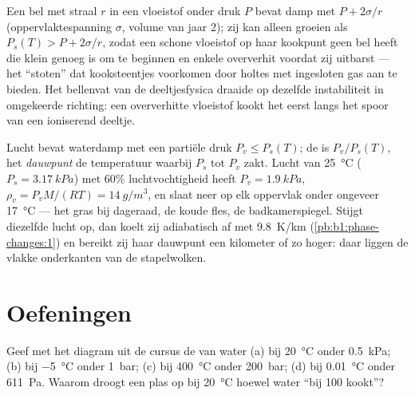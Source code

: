 \begin{remark}\label{rem:b1:phase-changes:nucleation}
Een bel met straal $r$ in een vloeistof onder druk $P$ bevat damp met
$P + 2\sigma/r$ (oppervlaktespanning $\sigma$, volume van jaar 2); zij kan alleen
groeien als $P_s(T) > P + 2\sigma/r$, zodat een schone vloeistof op haar kookpunt
geen bel heeft die klein genoeg is om te beginnen en enkele  oververhit
voordat zij uitbarst --- het ``stoten'' dat kooksteentjes voorkomen door
holtes met ingesloten gas aan te bieden. Het bellenvat van de deeltjesfysica
draaide op dezelfde instabiliteit in omgekeerde richting: een oververhitte vloeistof
kookt het eerst langs het spoor van een ioniserend deeltje.
\end{remark}

\begin{example}\label{ex:b1:phase-changes:dew}
Lucht bevat waterdamp met een partiële druk $P_v \leq P_s(T)$; de
\emph{} is $P_v/P_s(T)$, het \emph{dauwpunt} de
temperatuur waarbij $P_s$ tot $P_v$ zakt. Lucht van \qty{25}{\degreeCelsius}
($P_s = \qty{3.17}{kPa}$) met $60\%$ luchtvochtigheid heeft $P_v = \qty{1.9}{kPa}$,
$\rho_v = P_vM/(RT) = \qty{14}{g/m^3}$, en slaat neer op elk oppervlak onder
ongeveer \qty{17}{\degreeCelsius} --- het gras bij dageraad, de koude fles, de
badkamerspiegel. Stijgt diezelfde lucht op, dan koelt zij adiabatisch af met
\qty{9.8}{K/km} (\cref{pb:b1:phase-changes:1}) en bereikt zij haar dauwpunt een
kilometer of zo hoger: daar liggen de vlakke onderkanten van de stapelwolken.
\end{example}

\section{Oefeningen}

\begin{exercise}[$\star$]\label{exo:b1:phase-changes:1}
Geef met het diagram uit de cursus de  van water (a) bij
\qty{20}{\degreeCelsius} onder \qty{0.5}{kPa}; (b) bij \qty{-5}{\degreeCelsius}
onder \qty{1}{bar}; (c) bij \qty{400}{\degreeCelsius} onder \qty{200}{bar};
(d) bij \qty{0.01}{\degreeCelsius} onder \qty{611}{Pa}. Waarom droogt een plas op
bij \qty{20}{\degreeCelsius} hoewel water ``bij 100 kookt''?
\end{exercise}

